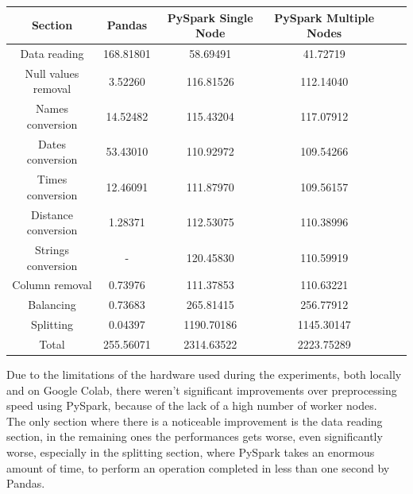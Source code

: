 \documentclass[
	letterpaper, %
	10pt, %
]{class}
\begin{document}
\begin{center}
    \begin{tabular}{ |c|c|c|c|c|c| }
        \hline
        Section             & Pandas    & PySpark Single Node & PySpark Multiple Nodes \\
        \hline
        Data reading        & 168.81801 & 58.69491            & 41.72719               \\
        Null values removal & 3.52260   & 116.81526           & 112.14040              \\
        Names conversion    & 14.52482  & 115.43204           & 117.07912              \\
        Dates conversion    & 53.43010  & 110.92972           & 109.54266              \\
        Times conversion    & 12.46091  & 111.87970           & 109.56157              \\
        Distance conversion & 1.28371   & 112.53075           & 110.38996              \\
        Strings conversion  & -         & 120.45830           & 110.59919              \\
        Column removal      & 0.73976   & 111.37853           & 110.63221              \\
        Balancing           & 0.73683   & 265.81415           & 256.77912              \\
        Splitting           & 0.04397   & 1190.70186          & 1145.30147             \\
        Total               & 255.56071 & 2314.63522          & 2223.75289             \\
        \hline
    \end{tabular}
\end{center}


Due to the limitations of the hardware used during the experiments, both locally and on Google Colab, there weren't significant improvements over preprocessing speed using PySpark, because of the lack of a high number of worker nodes.\\

The only section where there is a noticeable improvement is the data reading section, in the remaining ones the performances gets worse, even significantly worse, especially in the splitting section, where PySpark takes an enormous amount of time, to perform
an operation completed in less than one second by Pandas.\\
\end{document}
